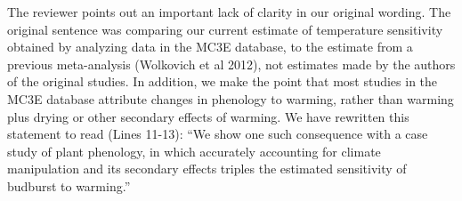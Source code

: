 \documentclass[11pt,a4paper]{letter}
\begin{document}
\begin{letter}{}
\par The reviewer points out an important lack of clarity in our original wording. The original sentence was comparing our current estimate of temperature sensitivity obtained by analyzing data in the MC3E database, to the estimate from a previous meta-analysis (Wolkovich et al 2012), not estimates made by the authors of the original studies.  In addition, we make the point that most studies in the MC3E database attribute changes in phenology to warming, rather than warming plus drying or other secondary effects of warming. We have rewritten this statement to read (Lines 11-13): ``We show one such consequence with a case study of plant phenology, in which accurately accounting for climate manipulation and its secondary effects triples the estimated sensitivity of budburst to warming.''

\\


\end{letter}
\end{document}
